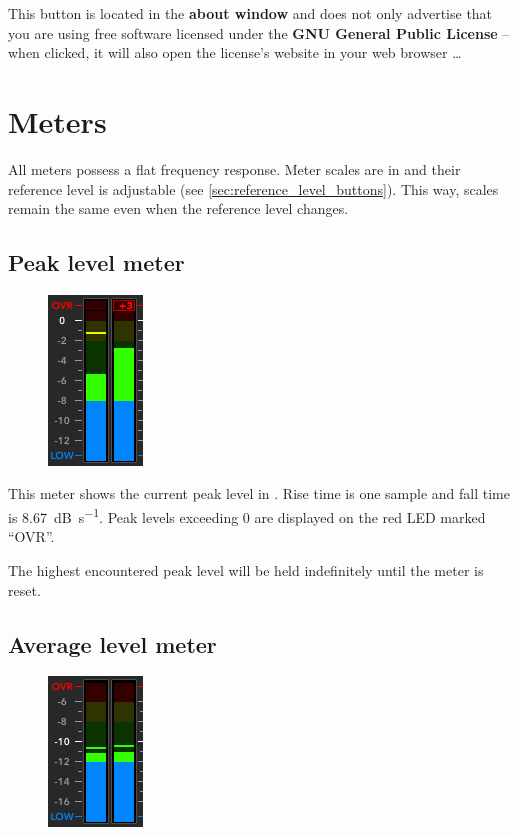 This button is located in the \textbf{about window} and does not only
advertise that you are using free software licensed under the
\textbf{GNU General Public License} -- when clicked, it will also open
the license's website in your web browser \dots

\chapter{Meters}
\label{chap:meters}

All meters possess a flat frequency response.  Meter scales are in
\si{\dBr} and their reference level is adjustable (see
\ref{sec:reference_level_buttons}).  This way, scales remain the same
even when the reference level changes.

\section{Peak level meter}

\begin{figure} %
  \includegraphics[scale=\screenshotscale,clip]{include/images/level_meter_peak.png}
\end{figure}

This meter shows the current peak level in \si{\dBr}.  Rise time is
one sample and fall time is \SI{8.67}{\dB\per\second}.  Peak levels
exceeding \SI{0}{\dBr} are displayed on the red LED marked ``OVR''.

The highest encountered peak level will be held indefinitely until the
meter is reset.

\newpage %

\section{Average level meter}

\begin{figure}
  \includegraphics[scale=\screenshotscale,clip]{include/images/level_meter_average.png}
\end{figure}


